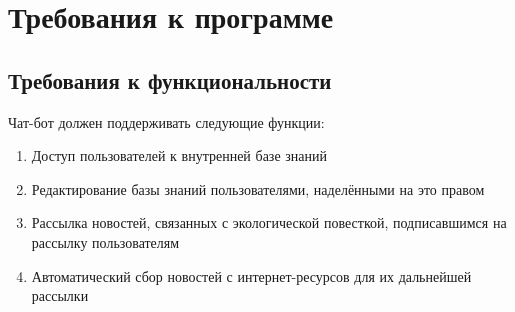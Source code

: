 \section{Требования к программе}
\label{sec:req}
\subsection{Требования к функциональности}
    \label{sec:req:fn}
    Чат-бот должен поддерживать следующие функции:
    \begin{enumerate}
        \item
            Доступ пользователей к внутренней базе знаний
        \item
            Редактирование базы знаний пользователями, наделёнными на это правом
        \item
            Рассылка новостей, связанных с экологической повесткой, подписавшимся на рассылку
            пользователям
        \item
            Автоматический сбор новостей с интернет-ресурсов для их дальнейшей рассылки
    \end{enumerate}

